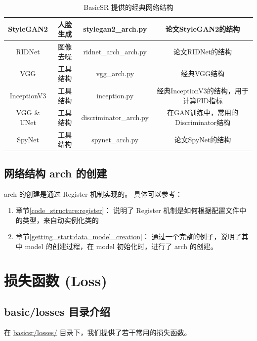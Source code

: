 \documentclass[../main.tex]{subfiles}
\begin{document}
\begin{table}[h]
{\begin{tabular}{|c|c|c|c|}
            StyleGAN2         & 人脸生成      & stylegan2\_arch.py     & 论文StyleGAN2的结构                    \\ \hline
            RIDNet            & 图像去噪      & ridnet\_arch\_arch.py  & 论文RIDNet的结构                       \\ \hline
            VGG               & 工具结构      & vgg\_arch.py           & 经典VGG结构                            \\ \hline
            InceptionV3       & 工具结构      & inception.py           & 经典InceptionV3的结构，用于计算FID指标 \\ \hline
            VGG \& UNet       & 工具结构      & discriminator\_arch.py & 在GAN训练中，常用的Discriminator结构   \\ \hline
            SpyNet            & 工具结构      & spynet\_arch.py        & 论文SpyNet的结构                       \\ \hline
        \end{tabular}
    }
    \caption{BasicSR 提供的经典网络结构}
\end{table}

\subsection{网络结构 arch 的创建}\label{code_structure:arch_creation}

arch 的创建是通过 Register 机制实现的。
具体可以参考：
\begin{enumerate}
    \item 章节\ref{code_structure:register}： 说明了 Register 机制是如何根据配置文件中的类型，来自动实例化类的
    \item 章节\ref{getting_start:data_model_creation}： 通过一个完整的例子，说明了其中 model 的创建过程，在 model 初始化时，进行了 arch 的创建。
\end{enumerate}

\section{损失函数 (Loss)}\label{code_structure:loss}

\subsection{basic/losses 目录介绍}\label{code_structure:loss_contents}
在 \href{https://github.com/XPixelGroup/BasicSR/tree/master/basicsr/losses}{basicsr/losses/} 目录下，我们提供了若干常用的损失函数。
\end{document}
